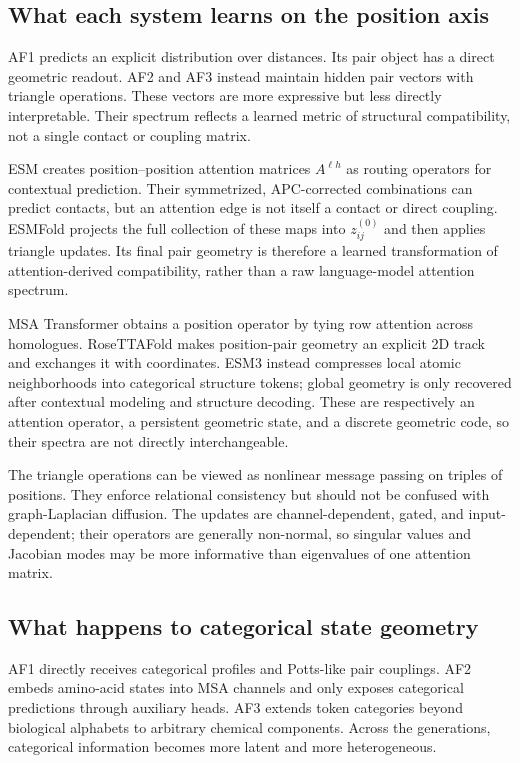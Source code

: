 \documentclass[10pt]{article}
\begin{document}
\subsection{What each system learns on the position axis}

AF1 predicts an explicit distribution over distances.  Its pair object has a direct geometric
readout.  AF2 and AF3 instead maintain hidden pair vectors with triangle operations.  These vectors
are more expressive but less directly interpretable.  Their spectrum reflects a learned metric of
structural compatibility, not a single contact or coupling matrix.

ESM creates position--position attention matrices $A^{\ell h}$ as routing operators for contextual
prediction.  Their symmetrized, APC-corrected combinations can predict contacts, but an attention
edge is not itself a contact or direct coupling.  ESMFold projects the full collection of these
maps into $z_{ij}^{(0)}$ and then applies triangle updates.  Its final pair geometry is therefore a
learned transformation of attention-derived compatibility, rather than a raw language-model
attention spectrum.

MSA Transformer obtains a position operator by tying row attention across homologues.  RoseTTAFold
makes position-pair geometry an explicit 2D track and exchanges it with coordinates.  ESM3 instead
compresses local atomic neighborhoods into categorical structure tokens; global geometry is only
recovered after contextual modeling and structure decoding.  These are respectively an attention
operator, a persistent geometric state, and a discrete geometric code, so their spectra are not
directly interchangeable.

The triangle operations can be viewed as nonlinear message passing on triples of positions.  They
enforce relational consistency but should not be confused with graph-Laplacian diffusion.  The
updates are channel-dependent, gated, and input-dependent; their operators are generally
non-normal, so singular values and Jacobian modes may be more informative than eigenvalues of one
attention matrix.

\subsection{What happens to categorical state geometry}

AF1 directly receives categorical profiles and Potts-like pair couplings.  AF2 embeds amino-acid
states into MSA channels and only exposes categorical predictions through auxiliary heads.  AF3
extends token categories beyond biological alphabets to arbitrary chemical components.  Across
the generations, categorical information becomes more latent and more heterogeneous.
\end{document}

